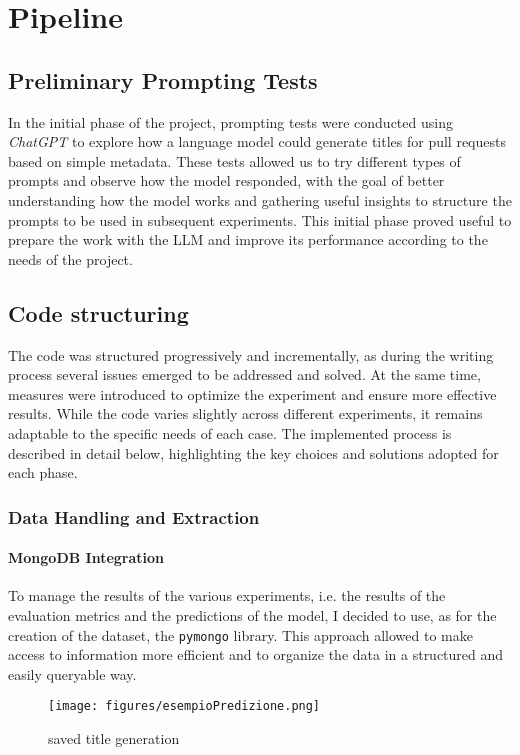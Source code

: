 \chapter{Pipeline}\label{chap:pipeline}
\section{Preliminary Prompting Tests}
In the initial phase of the project, prompting tests were conducted using \textit{ChatGPT} to explore how a language model could generate titles for pull requests based on simple metadata. These tests allowed us to try different types of prompts and observe how the model responded, with the goal of better understanding how the model works and gathering useful insights to structure the prompts to be used in subsequent experiments. This initial phase proved useful to prepare the work with the LLM and improve its performance according to the needs of the project.
\section{Code structuring}
The code was structured progressively and incrementally, as during the writing process several issues emerged to be addressed and solved. At the same time, measures were introduced to optimize the experiment and ensure more effective results. While the code varies slightly across different experiments, it remains adaptable to the specific needs of each case. The implemented process is described in detail below, highlighting the key choices and solutions adopted for each phase. 
\subsection{Data Handling and Extraction}
\subsubsection{MongoDB Integration}
To manage the results of the various experiments, i.e. the results of the evaluation metrics and the predictions of the model, I decided to use, as for the creation of the dataset, the \texttt{pymongo} library. This approach allowed to make access to information more efficient and to organize the data in a structured and easily queryable way.
\begin{figure}[H] 
    \centering
        \texttt{[image: figures/esempioPredizione.png]}
        \caption{saved title generation}     
\end{figure}
